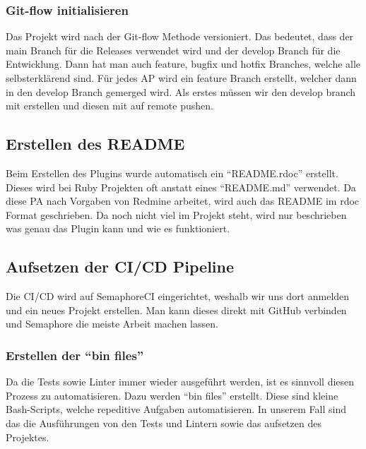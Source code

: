 \subsubsection{Git-flow initialisieren}
Das Projekt wird nach der Git-flow Methode versioniert. Das bedeutet, dass der main Branch für die Releases
verwendet wird und der develop Branch für die Entwicklung. \newline
Dann hat man auch feature, bugfix und hotfix Branches, welche alle selbsterklärend sind. \newline
Für jedes AP wird ein feature Branch erstellt, welcher dann in den develop Branch gemerged wird. \newline
Als erstes müssen wir den develop branch mit  erstellen und diesen
mit  auf remote pushen. \newline

\subsection{Erstellen des README}
Beim Erstellen des Plugins wurde automatisch ein \enquote{README.rdoc} erstellt. Dieses wird bei Ruby Projekten
oft anstatt eines \enquote{README.md} verwendet. Da diese PA nach Vorgaben von Redmine arbeitet, wird auch das
README im rdoc Format geschrieben. \newline
Da noch nicht viel im Projekt steht, wird nur beschrieben was genau das Plugin kann und wie es funktioniert.

\subsection{Aufsetzen der CI/CD Pipeline}
Die CI/CD wird auf SemaphoreCI eingerichtet, weshalb wir uns dort anmelden und ein neues Projekt erstellen. Man kann dieses
direkt mit GitHub verbinden und Semaphore die meiste Arbeit machen lassen.

\subsubsection{Erstellen der \enquote{bin files}}
Da die Tests sowie Linter immer wieder ausgeführt werden, ist es sinnvoll diesen Prozess zu automatisieren. Dazu werden 
\enquote{bin files} erstellt. Diese sind kleine Bash-Scripts, welche repeditive Aufgaben automatisieren. In unserem Fall sind
das die Ausführungen von den Tests und Lintern sowie das aufsetzen des Projektes. \newline


